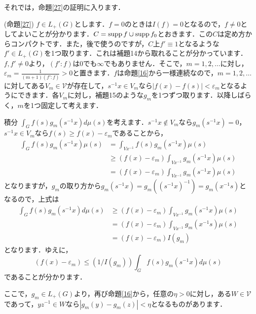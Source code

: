 それでは，命題\ref{27}の証明に入ります．
\begin{Proof}(命題\ref{27})
$f \in L_{+}(G)$とします．$f=0$のときは$I(f)=0$となるので，$f \neq 0$としてよいことが分かります．$C=\operatorname{supp} f \cup \operatorname{supp} f_{0}$とおきます．この$C$は定め方からコンパクトです．また，後で使うのですが，$C$上$f' \equiv 1$となるような$f' \in L_{
+}(G)$を1つ取ります．これは補題14から取れることが分かっています．$f, f' \neq 0$より，$\left( f' : f\right)$は0でも$\infty$でもありません．そこで，$m=1,2,\ldots$に対し，$\varepsilon_{m}=\frac{1}{(m+1)\left( f' : f \right)}>0$と置きます．$f$は命題\ref{16}から一様連続なので，$m=1,2,\ldots$に対してある$V_m \in \mathscr{V}$が存在して，$s^{-1}x \in V_m$なら$|f(x)-f(s)|<\varepsilon _{m}$となるようにできます．各$V_m$に対し，補題15のような$g_m$を1つずつ取ります．以降しばらく，$m$を1つ固定して考えます．

積分 $\int_{G}f(s)g_{m}(s^{-1}x)d\mu(s)$を考えます．$s^{-1}x \not\in V_m$なら$g_{m}(s^{-1}x)=0$，$s^{-1}x \in V_m$なら$f(s) \ge f(x) -\varepsilon_{m}$であることから，
\begin{align*}
\int_{G}f(s)g_{m}(s^{-1}x)\mu(s) & =\int_{Vx^{-1}}f(s)g_{m}(s^{-1}x)\mu(s) \\
 & \ge (f(x)-\varepsilon_{m})\int_{Vx^{-1}}g_{m}(s^{-1}x)\mu(s) \\
 & =(f(x)-\varepsilon_{m})\int_{Vx^{-1}}g_{m}(s^{-1}x)\mu(s)
\end{align*}
となりますが，$g_{m}$の取り方から$g_{m}(s^{-1}x)=g_{m}\left( (s^{-1}x)^{-1} \right)=g_{m}(x^{-1}s)$となるので，上式は
\begin{align*}
\int_{G}f(s)g_{m}(s^{-1}x)d\mu(s) & \ge (f(x)-\varepsilon_{m})\int_{Vx^{-1}}g_{m}(s^{-1}x)\mu(s) \\
 & = (f(x)-\varepsilon_{m})\int_{Vx^{-1}}g_{m}(x^{-1}s)\mu(s) \\
 & =(f(x)-\varepsilon_{m}) I(g_{m})
\end{align*}
となります．ゆえに，
\begin{equation}
(f(x)-\varepsilon_{m}) \le \left( 1/I(g_{m}) \right)\int_{G}f(s)g_{m}(s^{-1}x)d\mu(s)
\label{i2}
\end{equation}
であることが分かります．

ここで，$g_{m} \in L_{+}(G)$より，再び命題\ref{16}から，任意の$\eta >0$に対し，ある$W \in \mathscr{V}$であって，$yz^{-1} \in W$なら$|g_{m}(y)-g_{m}(z)|<\eta$となるものがあります．


\end{Proof}
